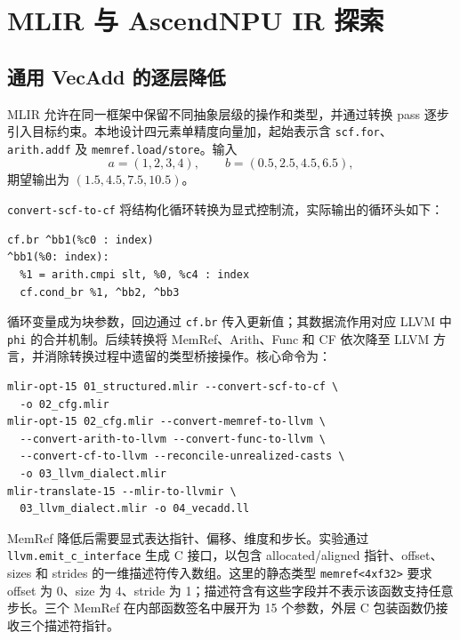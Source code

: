\documentclass[UTF8,a4paper,10pt,fontset=fandol]{ctexart}
\begin{document}
\section{MLIR 与 AscendNPU IR 探索}
\subsection{通用 VecAdd 的逐层降低}
MLIR 允许在同一框架中保留不同抽象层级的操作和类型，并通过转换 pass 逐步引入目标约束\cite{mlir}。本地设计四元素单精度向量加，起始表示含 \texttt{scf.for}、\texttt{arith.addf} 及 \texttt{memref.load/store}。输入
\[
a=(1,2,3,4),\qquad b=(0.5,2.5,4.5,6.5),
\]
期望输出为 $(1.5,4.5,7.5,10.5)$。

\texttt{convert-scf-to-cf} 将结构化循环转换为显式控制流，实际输出的循环头如下：
\par\noindent\begin{minipage}{\linewidth}
\begin{lstlisting}[numbers=none]
cf.br ^bb1(%c0 : index)
^bb1(%0: index):
  %1 = arith.cmpi slt, %0, %c4 : index
  cf.cond_br %1, ^bb2, ^bb3
\end{lstlisting}
\end{minipage}\par
循环变量成为块参数，回边通过 \texttt{cf.br} 传入更新值；其数据流作用对应 LLVM 中 \texttt{phi} 的合并机制。后续转换将 MemRef、Arith、Func 和 CF 依次降至 LLVM 方言，并消除转换过程中遗留的类型桥接操作。核心命令为：
\par\noindent\begin{minipage}{\linewidth}
\begin{lstlisting}[numbers=none]
mlir-opt-15 01_structured.mlir --convert-scf-to-cf \
  -o 02_cfg.mlir
mlir-opt-15 02_cfg.mlir --convert-memref-to-llvm \
  --convert-arith-to-llvm --convert-func-to-llvm \
  --convert-cf-to-llvm --reconcile-unrealized-casts \
  -o 03_llvm_dialect.mlir
mlir-translate-15 --mlir-to-llvmir \
  03_llvm_dialect.mlir -o 04_vecadd.ll
\end{lstlisting}
\end{minipage}\par
MemRef 降低后需要显式表达指针、偏移、维度和步长。实验通过 \texttt{llvm.emit\_c\_interface} 生成 C 接口，以包含 allocated/aligned 指针、offset、sizes 和 strides 的一维描述符传入数组。这里的静态类型 \texttt{memref<4xf32>} 要求 offset 为 0、size 为 4、stride 为 1；描述符含有这些字段并不表示该函数支持任意步长。三个 MemRef 在内部函数签名中展开为 15 个参数，外层 C 包装函数仍接收三个描述符指针。
\end{document}
